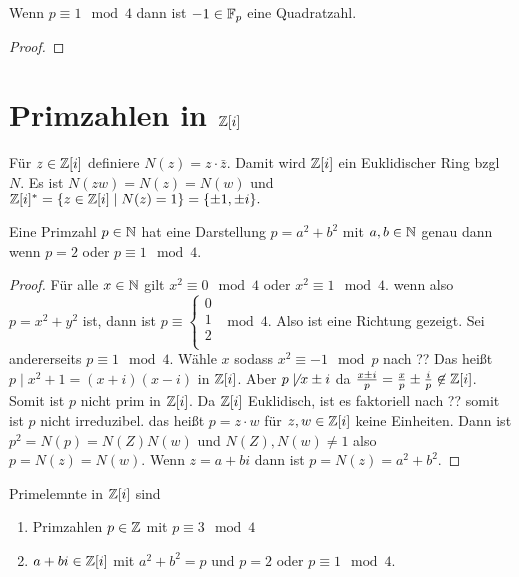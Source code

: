 \begin{Lemma}
    Wenn \(p\equiv 1 \mod 4\) dann ist \(-1\in \mathbb{F}_p\) eine Quadratzahl.
\end{Lemma}
\begin{proof}
    
\end{proof}
\section{Primzahlen in \(\mathbb{Z}[i]\)}
\begin{Bem}
    Für \(z\in\mathbb{Z}[i]\) definiere \(N(z)=z\cdot\bar{z}\). Damit wird \(\mathbb{Z}[i]\) ein Euklidischer 
    Ring bzgl \(N\).
    Es ist \(N(zw)=N(z)=N(w)\) und 
    \(\mathbb{Z}[i]^*=\{z\in \mathbb{Z}[i]\mid  N(z)=1\}=\{\pm 1,\pm i\}.\)
\end{Bem}
\begin{Satz} Eine Primzahl \(p\in \mathbb{N}\) hat eine Darstellung \(p=a^2+b^2\) mit \(a,b\in \mathbb{N}\) genau dann wenn
    \(p=2\) oder \(p \equiv 1 \mod 4\).
\end{Satz}
\begin{proof}
    Für alle \(x\in \mathbb{N}\) gilt \(x^2\equiv 0 \mod 4\) oder \(x^2\equiv 1\mod 4\).
    wenn also \(p=x^2+y^2\) ist, dann ist \(p \equiv\begin{cases}
        0 \\ 
        1\\
        2\\
    \end{cases} \mod 4\).
    Also ist eine Richtung gezeigt.
    Sei andererseits \(p\equiv 1 \mod 4\). Wähle \(x\) sodass \(x^2\equiv -1 \mod p\) nach ??
    Das heißt \(p\mid x^2+1=(x+i)(x-i)\) in \(\mathbb{Z}[i]\).
    Aber \(p\not \mid x\pm i\) da \(\frac{x\pm i}{p}=\frac x p \pm \frac i p\not\in\mathbb{Z}[i]\).
    Somit ist \(p\) nicht prim in \(\mathbb{Z}[i]\).
    Da \(\mathbb{Z}[i]\) Euklidisch, ist es faktoriell nach ?? somit ist \(p\) nicht irreduzibel.
    das heißt \(p=z\cdot w\) für \(z,w\in\mathbb{Z}[i]\) keine Einheiten.
    Dann ist \(p^2=N(p)=N(Z)N(w)\) und \(N(Z),N(w)\neq 1\) also \(p=N(z)=N(w)\).
    Wenn \(z=a+bi\) dann ist \(p=N(z)=a^2+b^2\).
\end{proof}
\begin{Satz}
    Primelemnte in \(\mathbb{Z}[i]\) sind 
    \begin{enumerate}
        \item Primzahlen \(p\in\mathbb{Z}\) mit \(p\equiv 3\mod 4\)
        \item \(a+bi\in\mathbb{Z}[i]\) mit \(a^2+b^2=p\) und \(p=2\) oder \(p\equiv 1 \mod 4\).
    \end{enumerate}
\end{Satz}
